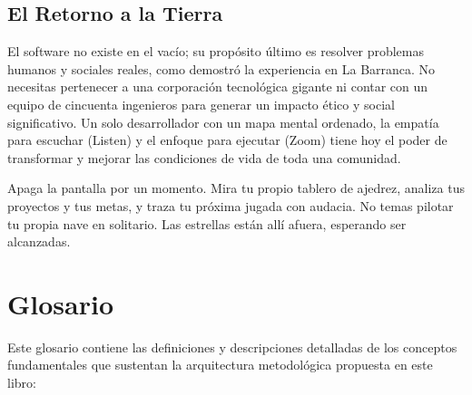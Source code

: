 \documentclass[14pt,a4paper,oneside]{extbook}
\begin{document}
\section{El Retorno a la Tierra}

El software no existe en el vacío; su propósito último es resolver problemas humanos y sociales reales, como demostró la experiencia en La Barranca. No necesitas pertenecer a una corporación tecnológica gigante ni contar con un equipo de cincuenta ingenieros para generar un impacto ético y social significativo. Un solo desarrollador con un mapa mental ordenado, la empatía para escuchar (Listen) y el enfoque para ejecutar (Zoom) tiene hoy el poder de transformar y mejorar las condiciones de vida de toda una comunidad.

Apaga la pantalla por un momento. Mira tu propio tablero de ajedrez, analiza tus proyectos y tus metas, y traza tu próxima jugada con audacia. No temas pilotar tu propia nave en solitario. Las estrellas están allí afuera, esperando ser alcanzadas.

\chapter*{Glosario}

Este glosario contiene las definiciones y descripciones detalladas de los conceptos fundamentales que sustentan la arquitectura metodológica propuesta en este libro:
\end{document}
